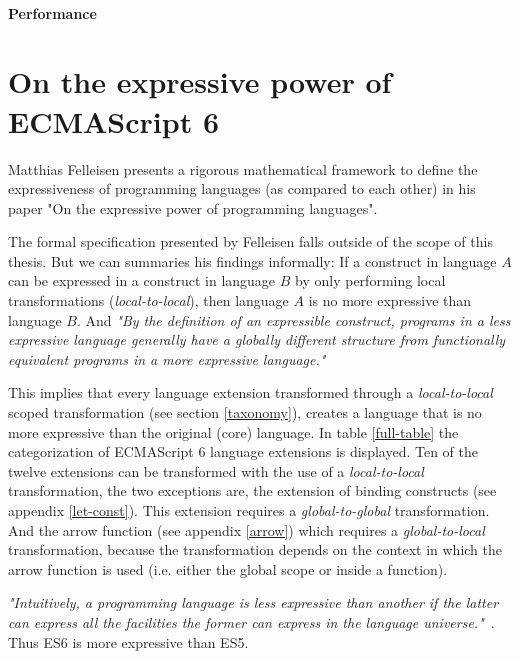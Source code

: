 \paragraph{Performance}

\section{On the expressive power of ECMAScript 6}
Matthias Felleisen presents a rigorous mathematical framework to define the expressiveness of programming languages (as compared to each other) in his paper "On the expressive power of programming languages"\cite{Felleisen1990}. 

The formal specification presented by Felleisen falls outside of the scope of this thesis. But we can summaries his findings informally: If a construct in language $A$ can be expressed in a construct in language $B$ by only performing local transformations (\textit{local-to-local}), then language $A$ is no more expressive than language $B$. And \textit{"By the definition of an expressible construct, programs in a less expressive language generally have a globally different structure from functionally equivalent programs in a more expressive language."}\cite{Felleisen1990} 

This implies that every language extension transformed through a \textit{local-to-local} scoped transformation (see section \ref{taxonomy}), creates a language that is no more expressive than the original (core) language. In table \ref{full-table} the categorization of ECMAScript 6 language extensions is displayed. Ten of the twelve extensions can be transformed with the use of a \textit{local-to-local} transformation, the two exceptions are, the extension of binding constructs (see appendix \ref{let-const}). This extension requires a \textit{global-to-global} transformation. And the arrow function (see appendix \ref{arrow}) which requires a \textit{global-to-local} transformation, because the transformation depends on the context in which the arrow function is used (i.e. either the global scope or inside a function).

\textit{"Intuitively, a programming language is less expressive than another if the latter can express all the facilities the former can express in the language universe."}~\cite{Felleisen1990}. Thus ES6 is more expressive than ES5.

